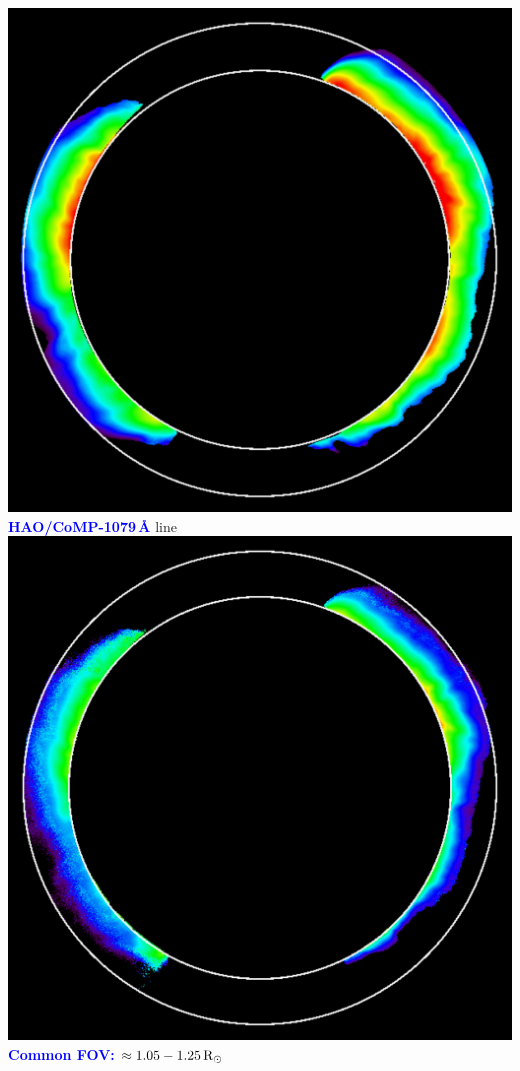 \documentclass[a0,portrait,final]{baposter_old}
\def\azul#1{\textcolor{blue}{\bf\sf #1}}
\newcommand{\mrsun}{\rm{R}_\odot}
\begin{document}
\begin{poster}
{{\begin{center}
\includegraphics[width=0.9\columnwidth]{20171203_214113_comp_1074_dynamics_avg_total_intensity_t018-Dt8_images.pdf}\\
\azul{HAO/CoMP-1079\,\AA} line\\
\includegraphics[width=0.9\columnwidth]{20171203_202649_comp_1079_dynamics_avg_total_intensity_t018-Dt8.pdf}
\vskip 0.1cm
\azul{Common FOV: $\approx 1.05-1.25\,\mrsun$}
\end{center}
}
}


\end{poster}
\end{document}
